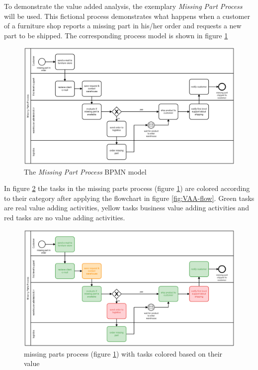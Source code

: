 To demonstrate the value added analysis, the exemplary \textit{Missing Part Process} will be used. This fictional process demonstrates what happens when a customer of a furniture shop reports a missing part in his/her order and requests a new part to be shipped. The corresponding process model is shown in figure \ref{fig:missing-part-process}

\begin{figure}[H]
	\centering
	\includegraphics[width=1\columnwidth]{processes/missing-parts-process/missing-parts-process}
	\caption{The \textit{Missing Part Process} BPMN model} 
	\label{fig:missing-part-process} 
\end{figure}

In figure \ref{fig:VAA-missing-parts} the tasks in the missing parts process (figure \ref{fig:missing-part-process}) are colored according to their category after applying the flowchart in figure \ref{fig:VAA-flow}. Green tasks are real value adding activities, yellow tasks business value adding activities and red tasks are no value adding activities. 

\begin{figure}[H]
	\centering
	\includegraphics[width=1\columnwidth]{graphics/missing-parts-process-vaa}
	\caption{missing parts process (figure \ref{fig:missing-part-process}) with tasks colored based on their value} 
	\label{fig:VAA-missing-parts} 
\end{figure}


